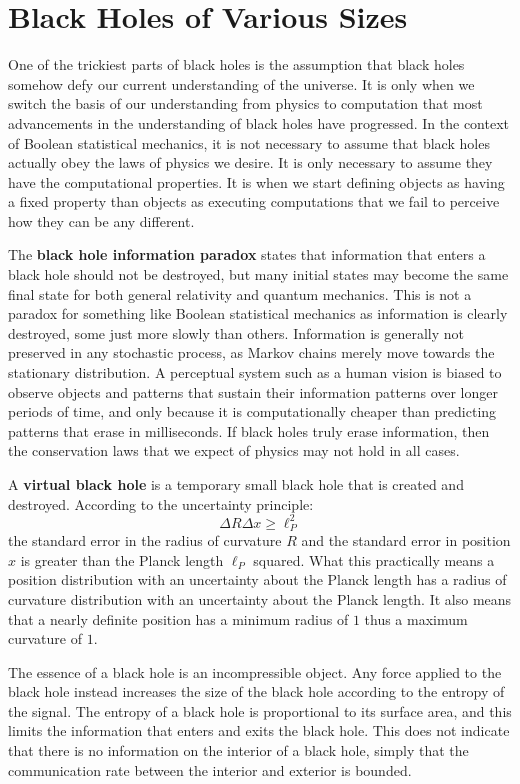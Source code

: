\documentclass[10pt, a5paper, twoside, openright]{memoir}
\begin{document}
\section{Black Holes of Various Sizes}
One of the trickiest parts of black holes is the assumption that black holes somehow defy our current understanding of the universe. It is only when we switch the basis of our understanding from physics to computation that most advancements in the understanding of black holes have progressed. In the context of Boolean statistical mechanics, it is not necessary to assume that black holes actually obey the laws of physics we desire. It is only necessary to assume they have the computational properties. It is when we start defining objects as having a fixed property than objects as executing computations that we fail to perceive how they can be any different.

The \textbf{black hole information paradox} states that information that enters a black hole should not be destroyed, but many initial states may become the same final state for both general relativity and quantum mechanics. This is not a paradox for something like Boolean statistical mechanics as information is clearly destroyed, some just more slowly than others. Information is generally not preserved in any stochastic process, as Markov chains merely move towards the stationary distribution. A perceptual system such as a human vision is biased to observe objects and patterns that sustain their information patterns over longer periods of time, and only because it is computationally cheaper than predicting patterns that erase in milliseconds. If black holes truly erase information, then the conservation laws that we expect of physics may not hold in all cases.

A \textbf{virtual black hole} is a temporary small black hole that is created and destroyed. According to the uncertainty principle:
$$\Delta R \Delta x \geq \ell_P^2$$
the standard error in the radius of curvature $R$ and the standard error in position $x$ is greater than the Planck length $\ell_P$ squared. What this practically means a position distribution with an uncertainty about the Planck length has a radius of curvature distribution with an uncertainty about the Planck length. It also means that a nearly definite position has a minimum radius of $1$ thus a maximum curvature of $1$.

The essence of a black hole is an incompressible object. Any force applied to the black hole instead increases the size of the black hole according to the entropy of the signal. The entropy of a black hole is proportional to its surface area, and this limits the information that enters and exits the black hole. This does not indicate that there is no information on the interior of a black hole, simply that the communication rate between the interior and exterior is bounded.
\end{document}
